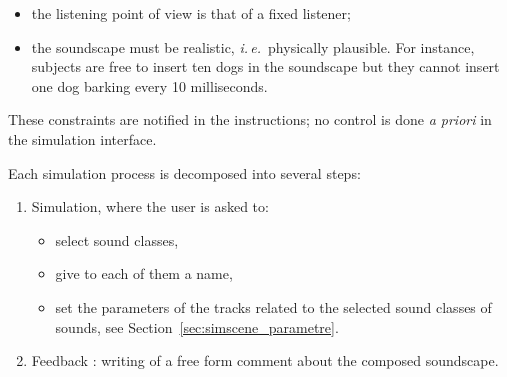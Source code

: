 \documentclass[12pt]{elsarticle}
\newcommand{\ie}{\emph{i.\,e.}}
\newcommand{\cf}{cf.}
\begin{document}
\begin{itemize}
\item the listening point of view is that of a fixed listener;
\item the soundscape must be realistic, \ie~physically plausible. For instance, subjects are free to insert ten dogs in the soundscape but they cannot insert one dog barking every 10 milliseconds.
\end{itemize}


These constraints are notified in the instructions; no control is done \emph{a priori} in the simulation interface.


%

Each simulation process is decomposed into several steps:

\begin{enumerate}
\item Simulation, where the user is asked to:
  \begin{itemize}
  \item  select sound classes,
  \item  give to each of them a name,
  \item  set the parameters of the tracks related to the selected sound classes of sounds, see Section~\ref{sec:simscene_parametre}.
  \end{itemize}
\item Feedback : writing of a free form comment about the composed soundscape.
\end{enumerate}
\end{document}
